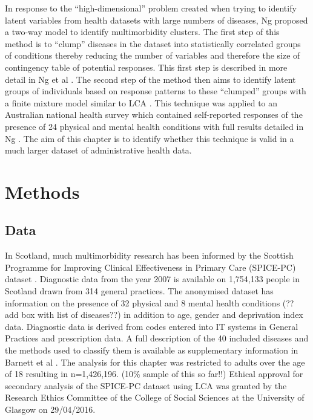\documentclass[12pt,]{report}
\begin{document}
In response to the ``high-dimensional'' problem created when trying to
identify latent variables from health datasets with large numbers of
diseases, Ng \citeyearpar{RN72} proposed a two-way model to identify
multimorbidity clusters. The first step of this method is to ``clump''
diseases in the dataset into statistically correlated groups of
conditions thereby reducing the number of variables and therefore the
size of contingency table of potential responses. This first step is
described in more detail in Ng et al \citeyearpar{RN225}. The second
step of the method then aims to identify latent groups of individuals
based on response patterns to these ``clumped'' groups with a finite
mixture model similar to LCA \citep{RN72}. This technique was applied to
an Australian national health survey which contained self-reported
responses of the presence of 24 physical and mental health conditions
with full results detailed in Ng \citeyearpar{RN72}. The aim of this
chapter is to identify whether this technique is valid in a much larger
dataset of administrative health data.

\section{Methods}\label{sec:clust-methods}

\subsection{Data}\label{subsec:clust-data}

In Scotland, much multimorbidity research has been informed by the
Scottish Programme for Improving Clinical Effectiveness in Primary Care
(SPICE-PC) dataset \citep{RN292, RN33, RN159, RN148}. Diagnostic data
from the year 2007 is available on 1,754,133 people in Scotland drawn
from 314 general practices. The anonymised dataset has information on
the presence of 32 physical and 8 mental health conditions (?? add box
with list of diseases??) in addition to age, gender and deprivation
index data. Diagnostic data is derived from codes entered into IT
systems in General Practices and prescription data. A full description
of the 40 included diseases and the methods used to classify them is
available as supplementary information in Barnett et al
\citeyearpar{RN33}. The analysis for this chapter was restricted to
adults over the age of 18 resulting in n=1,426,196. (10\% sample of this
so far!!) Ethical approval for secondary analysis of the SPICE-PC
dataset using LCA was granted by the Research Ethics Committee of the
College of Social Sciences at the University of Glasgow on 29/04/2016.
\end{document}
